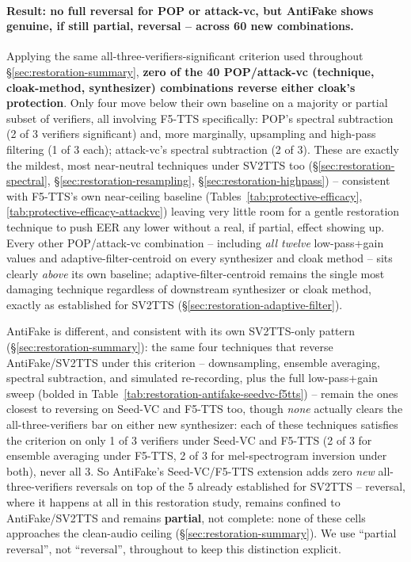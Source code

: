\documentclass[11pt]{article}
\begin{document}
\paragraph{Result: no full reversal for POP or attack-vc, but AntiFake
shows genuine, if still partial, reversal -- across 60 new
combinations.} Applying the same all-three-verifiers-significant
criterion used throughout \S\ref{sec:restoration-summary}, \textbf{zero
of the 40 POP/attack-vc (technique, cloak-method, synthesizer)
combinations reverse either cloak's protection}. Only four move below
their own baseline on a majority or partial subset of verifiers, all
involving F5-TTS specifically: POP's spectral subtraction (2 of 3
verifiers significant) and, more marginally, upsampling and high-pass
filtering (1 of 3 each); attack-vc's spectral subtraction (2 of 3).
These are exactly the mildest, most near-neutral techniques under
SV2TTS too (\S\ref{sec:restoration-spectral},
\S\ref{sec:restoration-resampling}, \S\ref{sec:restoration-highpass})
-- consistent with F5-TTS's own near-ceiling baseline
(Tables~\ref{tab:protective-efficacy}, \ref{tab:protective-efficacy-attackvc})
leaving very little room for a gentle restoration technique to push EER
any lower without a real, if partial, effect showing up. Every other
POP/attack-vc combination -- including \emph{all twelve} low-pass+gain
values and adaptive-filter-centroid on every synthesizer and cloak
method -- sits clearly \emph{above} its own baseline;
adaptive-filter-centroid remains the single most damaging technique
regardless of downstream synthesizer or cloak method, exactly as
established for SV2TTS (\S\ref{sec:restoration-adaptive-filter}).

AntiFake is different, and consistent with its own SV2TTS-only pattern
(\S\ref{sec:restoration-summary}): the same four techniques that
reverse AntiFake/SV2TTS under this criterion -- downsampling, ensemble
averaging, spectral subtraction, and simulated re-recording, plus the
full low-pass+gain sweep (bolded in
Table~\ref{tab:restoration-antifake-seedvc-f5tts}) -- remain the ones
closest to reversing on Seed-VC and F5-TTS too, though \emph{none}
actually clears the all-three-verifiers bar on either new synthesizer:
each of these techniques satisfies the criterion on only 1 of 3
verifiers under Seed-VC and F5-TTS (2 of 3 for ensemble averaging under
F5-TTS, 2 of 3 for mel-spectrogram inversion under both), never all 3.
So AntiFake's Seed-VC/F5-TTS extension adds zero \emph{new}
all-three-verifiers reversals on top of the 5 already established for
SV2TTS -- reversal, where it happens at all in this restoration study,
remains confined to AntiFake/SV2TTS and remains \textbf{partial}, not
complete: none of these cells approaches the clean-audio ceiling
(\S\ref{sec:restoration-summary}). We use ``partial reversal'', not
``reversal'', throughout to keep this distinction explicit.
\end{document}
